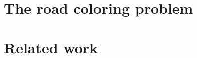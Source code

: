 \documentclass{irmaart}
\theoremstyle{plain}
\begin{document}
\section{The road coloring problem}
\label{KV:sec:rcp}

\section{Related work}
\label{KV:sec:related}


\begin{footnotesize}
  
\end{footnotesize}


\markright{\indexname}\markboth{\indexname}{\indexname}
\printindex
\end{document}
